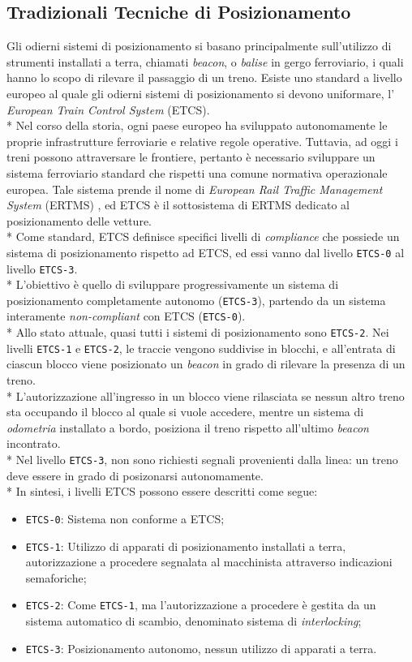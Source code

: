 \subsection{Tradizionali Tecniche di Posizionamento}
Gli odierni sistemi di posizionamento si basano principalmente sull'utilizzo di strumenti installati a terra, chiamati \emph{beacon}, o \emph{balise} in gergo ferroviario, i quali hanno lo scopo di rilevare il passaggio di un treno.\cite{tecnicheodierne}
Esiste uno standard a livello europeo al quale gli odierni sistemi di posizionamento si devono uniformare, l' \emph{European Train Control System} (ETCS).\\*
Nel corso della storia, ogni paese europeo ha sviluppato autonomamente le proprie infrastrutture ferroviarie e relative regole operative. Tuttavia, ad oggi i treni possono attraversare le frontiere, pertanto \`e necessario sviluppare un sistema ferroviario standard che rispetti una comune normativa operazionale europea. Tale sistema prende il nome di \emph{European Rail Traffic Management System} (ERTMS) \cite{ertms}, ed ETCS \`e il sottosistema di ERTMS dedicato al posizionamento delle vetture.\\*
Come standard, ETCS definisce specifici livelli di \emph{compliance} che possiede un sistema di posizionamento rispetto ad ETCS, ed essi vanno dal livello \texttt{ETCS-0} al livello \texttt{ETCS-3}.\\*
L'obiettivo \`e quello di sviluppare progressivamente un sistema di posizionamento completamente autonomo (\texttt{ETCS-3}), partendo da un sistema interamente \emph{non-compliant} con ETCS (\texttt{ETCS-0}).
\\*
Allo stato attuale, quasi tutti i sistemi di posizionamento sono \texttt{ETCS-2}. Nei livelli \texttt{ETCS-1} e \texttt{ETCS-2}, le traccie vengono suddivise in blocchi, e all'entrata di ciascun blocco viene posizionato un \emph{beacon} in grado di rilevare la presenza di un treno.\\*
L'autorizzazione all'ingresso in un blocco viene rilasciata se nessun altro treno sta occupando il blocco al quale si vuole accedere, mentre un sistema di \emph{odometria} installato a bordo, posiziona il treno rispetto all'ultimo \emph{beacon} incontrato.\\*
Nel livello \texttt{ETCS-3}, non sono richiesti segnali provenienti dalla linea: un treno deve essere in grado di posizonarsi autonomamente. \cite{etcs3}\\*
In sintesi, i livelli ETCS possono essere descritti come segue:
\begin{itemize}
	\item \texttt{ETCS-0}: Sistema non conforme a ETCS;
	\item \texttt{ETCS-1}: Utilizzo di apparati di posizionamento installati a terra, autorizzazione a procedere segnalata al macchinista attraverso indicazioni semaforiche;
	\item \texttt{ETCS-2}: Come \texttt{ETCS-1}, ma l'autorizzazione a procedere \`e gestita da un sistema automatico di scambio, denominato sistema di \emph{interlocking};\cite{interlocking}
	\item \texttt{ETCS-3}: Posizionamento autonomo, nessun utilizzo di apparati a terra.
\end{itemize}
